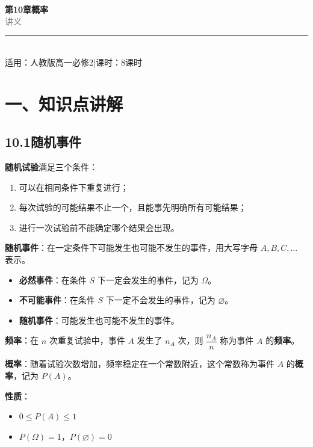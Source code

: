\documentclass[12pt, a4paper]{ctexart}
\begin{document}
\begin{center}
{\Huge\bfseries\textcolor{mainblue}{第10章\quad 概\quad 率}}\\[12pt]
{\Large\textcolor{gray}{讲\quad 义}}\\[8pt]
\rule{0.6\textwidth}{1pt}\\[8pt]
{\normalsize 适用：人教版\quad 高一必修2\quad |\quad 课时：8课时}
\end{center}
\vspace{10pt}

\section*{\textcolor{mainblue}{一、知识点讲解}}

\subsection*{10.1\quad 随机事件}

\begin{knowledgebox}[随机试验与随机事件]
\textbf{随机试验}满足三个条件：
\begin{enumerate}[label=(\arabic*)]
  \item 可以在相同条件下重复进行；
  \item 每次试验的可能结果不止一个，且能事先明确所有可能结果；
  \item 进行一次试验前不能确定哪个结果会出现。
\end{enumerate}

\textbf{随机事件}：在一定条件下可能发生也可能不发生的事件，用大写字母 $A, B, C, \ldots$ 表示。
\end{knowledgebox}

\begin{knowledgebox}[事件的分类]
\begin{itemize}
  \item \textbf{必然事件}：在条件 $S$ 下一定会发生的事件，记为 $\Omega$。
  \item \textbf{不可能事件}：在条件 $S$ 下一定不会发生的事件，记为 $\varnothing$。
  \item \textbf{随机事件}：可能发生也可能不发生的事件。
\end{itemize}
\end{knowledgebox}

\begin{knowledgebox}[频率与概率]
\textbf{频率}：在 $n$ 次重复试验中，事件 $A$ 发生了 $n_A$ 次，则 $\dfrac{n_A}{n}$ 称为事件 $A$ 的\textbf{频率}。

\textbf{概率}：随着试验次数增加，频率稳定在一个常数附近，这个常数称为事件 $A$ 的\textbf{概率}，记为 $P(A)$。

\textbf{性质}：
\begin{itemize}
  \item $0 \leqslant P(A) \leqslant 1$
  \item $P(\Omega) = 1$，$P(\varnothing) = 0$
\end{itemize}
\end{knowledgebox}
\end{document}
